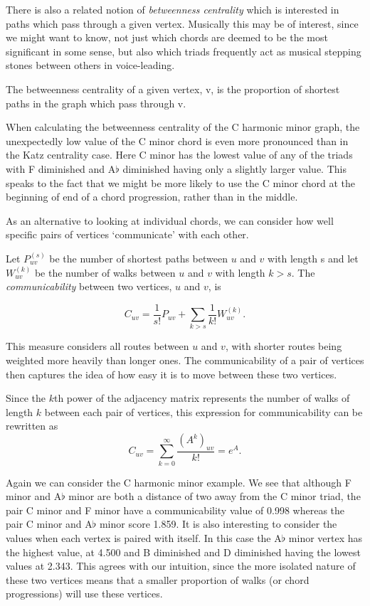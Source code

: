 \documentclass[]{tMAM2e}
\begin{document}
There is also a related notion of \textit{betweenness centrality} which is interested in paths which pass through a given vertex. Musically this may be of interest, since we might want to know, not just which chords are deemed to be the most significant in some sense, but also which triads frequently act as musical stepping stones between others in voice-leading.

\begin{definition}The betweenness centrality of a given vertex, v, is the proportion of shortest paths in the graph which pass through v.\cite{brandes2001faster}
\end{definition}

When calculating the betweenness centrality of the C harmonic minor graph, the unexpectedly low value of the C minor chord is even more pronounced than in the Katz centrality case. Here C minor has the lowest value of any of the triads with F diminished and A$\flat$ diminished having only a slightly larger value. This speaks to the fact that we might be more likely to use the C minor chord at the beginning of end of a chord progression, rather than in the middle.


As an alternative to looking at individual chords, we can consider how well specific pairs of vertices `communicate' with each other.

\begin{definition}Let $P_{uv}^{(s)}$ be the number of shortest paths between $u$ and $v$ with length s and let $W_{uv}^{(k)}$ be the number of walks between $u$ and $v$ with length $k>s$. The \textit{communicability} \cite{estrada2008communicability} between two vertices, $u$ and $v$, is

$$C_{uv}=\frac{1}{s!}P_{uv}+\sum_{k>s}\frac{1}{k!}W_{uv}^{(k)}.$$

\end{definition}

This measure considers all routes between $u$ and $v$, with shorter routes being weighted more heavily than longer ones. The communicability of a pair of vertices then captures the idea of how easy it is to move between these two vertices.

Since the $k$th power of the adjacency matrix represents the number of walks of length $k$ between each pair of vertices, this expression for communicability can be rewritten as $$C_{uv}=\sum_{k=0}^{\infty}\frac{(A^k)_{uv}}{k!}=e^A.$$

Again we can consider the C harmonic minor example. We see that although F minor and A$\flat$ minor are both a distance of two away from the C minor triad, the pair C minor and F minor have a communicability value of 0.998 whereas the pair C minor and A$\flat$ minor score 1.859. It is also interesting to consider the values when each vertex is paired with itself. In this case the A$\flat$ minor vertex has the highest value, at 4.500 and B diminished and D diminished having the lowest values at 2.343. This agrees with our intuition, since the more isolated nature of these two vertices means that a smaller proportion of walks (or chord progressions) will use these vertices. 
\end{document}
